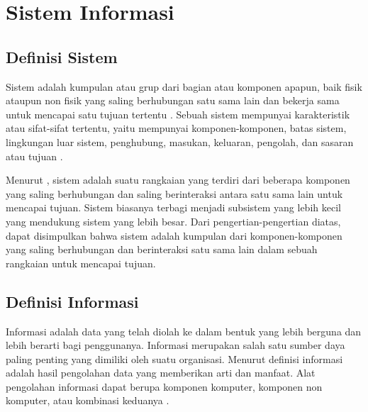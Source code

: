 	
\section{Sistem Informasi}
\subsection{Definisi Sistem}
	Sistem adalah kumpulan atau grup dari bagian atau komponen apapun, baik fisik ataupun non fisik yang saling berhubungan satu sama lain dan bekerja sama untuk mencapai satu tujuan tertentu \citep{Susanto2017}. Sebuah sistem mempunyai karakteristik atau sifat-sifat tertentu, yaitu mempunyai komponen-komponen, batas sistem, lingkungan luar sistem, penghubung, masukan, keluaran, pengolah, dan sasaran atau tujuan \citep{Ladjamudin2005}.

	Menurut \cite{Romney2009}, sistem adalah suatu rangkaian yang terdiri dari beberapa komponen yang saling berhubungan dan saling berinteraksi antara satu sama lain untuk mencapai tujuan. Sistem biasanya terbagi menjadi subsistem yang lebih kecil yang mendukung sistem yang lebih besar. Dari pengertian-pengertian diatas, dapat disimpulkan bahwa sistem adalah kumpulan dari komponen-komponen yang saling berhubungan dan berinteraksi satu sama lain dalam sebuah rangkaian untuk mencapai tujuan.

\subsection{Definisi Informasi}
	Informasi adalah data yang telah diolah ke dalam bentuk yang lebih berguna dan lebih berarti bagi penggunanya. Informasi merupakan salah satu sumber daya paling penting yang dimiliki oleh suatu organisasi. Menurut \cite{Susanto2017} definisi informasi adalah hasil pengolahan data yang memberikan arti dan manfaat. Alat pengolahan informasi dapat berupa komponen komputer, komponen non komputer, atau kombinasi keduanya \citep{Ladjamudin2005}.

